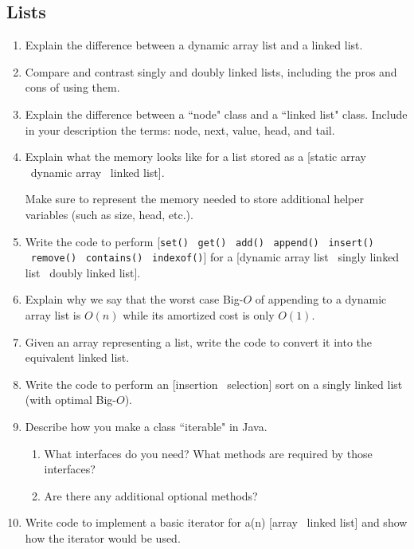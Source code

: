 \documentclass[10pt]{article}
\begin{document}
\subsection{Lists}
\begin{enumerate}[leftmargin=0em]\addtocounter{enumi}{7}
    \item Explain the difference between a dynamic array list and a linked list.
    \item Compare and contrast singly and doubly linked lists, including the pros and cons of using them.
    \item Explain the difference between a ``node" class and a ``linked list" class. Include in your description the terms: node, next, value, head, and tail.
    \item Explain what the memory looks like for a list stored as a [static array \vline\  dynamic array \vline\ linked list].
    
    Make sure to represent the memory needed to store additional helper variables (such as size, head, etc.).
    \texttt{}
    \item Write the code to perform [\texttt{set()} \vline\ \texttt{get()} \vline\ \texttt{add()} \vline\ \texttt{append()} \vline\ \texttt{insert()} \vline\ \texttt{remove()} \vline\ \texttt{contains()} \vline\ \texttt{indexof()}] for a [dynamic array list \vline\ singly linked list \vline\ doubly linked list].
    \item Explain why we say that the worst case Big-$O$ of appending to a dynamic array list is $O(n)$ while its amortized cost is only $O(1)$.
    \item Given an array representing a list, write the code to convert it into the equivalent linked list.
    \item Write the code to perform an [insertion \vline\ selection] sort on a singly linked list (with optimal Big-$O$).
    \item Describe how you make a class ``iterable" in Java.
    \begin{enumerate}
        \item What interfaces do you need? What methods are required by those interfaces?
        \item Are there any additional optional methods?
    \end{enumerate} 
    \item Write code to implement a basic iterator for a(n) [array \vline\ linked list] and show how the iterator would be used.
\end{enumerate}
\end{document}
